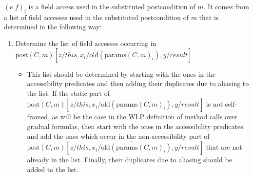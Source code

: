 \documentclass {article}
\newcommand{\fphi}{\widehat{\phi}}
\begin{document}
$(e.f)_i$ is a field access used in the substituted postcondition of $m$. It comes from a list of field accesses used in the substituted postcondition of $m$ that is determined in the following way:
\begin{enumerate}
\item Determine the list of field accesses occurring in $\text{post}(C,m)\left[z/this, \overline{x_i/\text{old}(\text{params}(C,m)_i)}, y/result \right]$
	\begin{itemize}
	\item This list should be determined by starting with the ones in the accessibility predicates and then adding their duplicates due to aliasing to the list. If the static part of $\text{post}(C,m)\left[z/this, \overline{x_i/\text{old}(\text{params}(C,m)_i)}, y/result \right]$ is not self-framed, as will be the case in the WLP definition of method calls over gradual formulas, then start with the ones in the accessibility predicates and add the ones which occur in the non-accessibility part of $\text{post}(C,m)\left[z/this, \overline{x_i/\text{old}(\text{params}(C,m)_i)}, y/result \right]$ that are not already in the list. Finally, their duplicates due to aliasing should be added to the list.
	\end{itemize}
\end{enumerate} 
\end{document}

